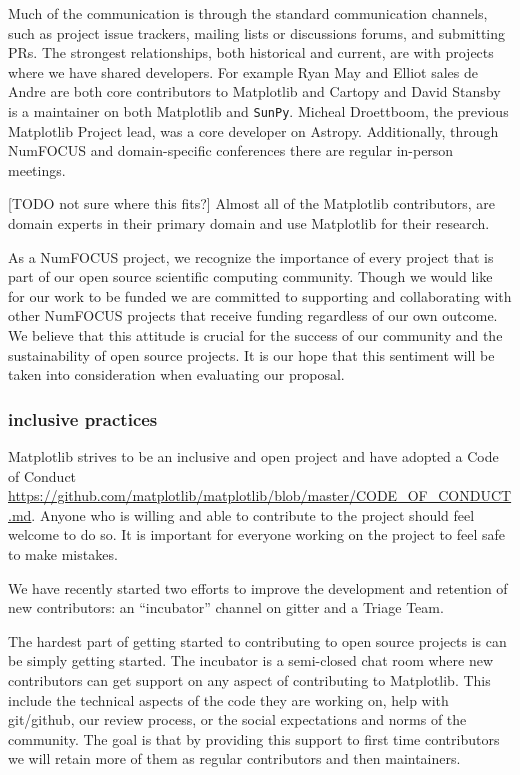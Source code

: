 \documentclass[12pt]{article}
\numberwithin{page}{section}
\begin{document}
Much of the communication is through the standard communication
channels, such as project issue trackers, mailing lists or discussions
forums, and submitting PRs.  The strongest relationships, both
historical and current, are with projects where we have shared
developers.  For example Ryan May and Elliot sales de Andre are both
core contributors to Matplotlib and Cartopy and David Stansby is a
maintainer on both Matplotlib and \texttt{SunPy}.  Micheal Droettboom,
the previous Matplotlib Project lead, was a core developer on Astropy.
Additionally, through NumFOCUS and domain-specific conferences there
are regular in-person meetings.

[TODO not sure where this fits?] Almost all of the Matplotlib
contributors, are domain experts in their primary domain and use
Matplotlib for their research.


As a NumFOCUS project, we recognize the importance of every project
that is part of our open source scientific computing community. Though
we would like for our work to be funded we are committed to supporting
and collaborating with other NumFOCUS projects that receive funding
regardless of our own outcome. We believe that this attitude is
crucial for the success of our community and the sustainability of
open source projects. It is our hope that this sentiment will be taken
into consideration when evaluating our proposal.


\subsubsection{inclusive practices}

Matplotlib strives to be an inclusive and open project and have
adopted a Code of Conduct
\url{https://github.com/matplotlib/matplotlib/blob/master/CODE_OF_CONDUCT.md}. Anyone
who is willing and able to contribute to the project should feel
welcome to do so.  It is important for everyone working on the project
to feel safe to make mistakes.

We have recently started two efforts to improve the development and
retention of new contributors: an ``incubator'' channel on gitter and
a Triage Team.

The hardest part of getting started to contributing to open source
projects is can be simply getting started.  The incubator is a
semi-closed chat room where new contributors can get support on any
aspect of contributing to Matplotlib.  This include the technical
aspects of the code they are working on, help with git/github, our
review process, or the social expectations and norms of the community.  The
goal is that by providing this support to first time contributors we will
retain more of them as regular contributors and then maintainers.
\end{document}
